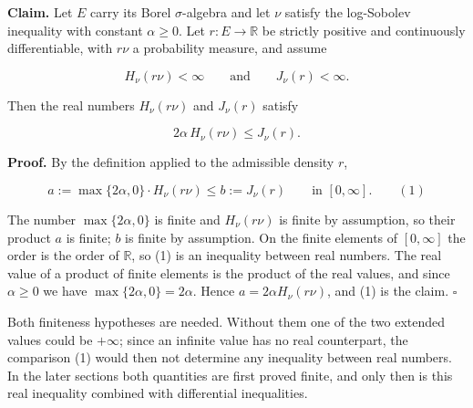 \documentclass[11pt,a4paper]{report}
\begin{document}
\textbf{Claim.} Let \(E\) carry its Borel \(\sigma\)-algebra and let \(\nu\) satisfy the log-Sobolev inequality with constant \(\alpha\ge0\). Let \(r:E\to\mathbb R\) be strictly positive and continuously differentiable, with \(r\nu\) a probability measure, and assume


\[H_\nu(r\nu)<\infty\qquad\text{and}\qquad J_\nu(r)<\infty.\]


Then the real numbers \(H_\nu(r\nu)\) and \(J_\nu(r)\) satisfy


\[2\alpha\,H_\nu(r\nu)\le J_\nu(r).\]


\textbf{Proof.} By the definition applied to the admissible density \(r\),


\[a:=\max\{2\alpha,0\}\cdot H_\nu(r\nu)\le b:=J_\nu(r)\qquad\text{in }[0,\infty].\qquad(1)\]


The number \(\max\{2\alpha,0\}\) is finite and \(H_\nu(r\nu)\) is finite by assumption, so their product \(a\) is finite; \(b\) is finite by assumption. On the finite elements of \([0,\infty]\) the order is the order of \(\mathbb R\), so (1) is an inequality between real numbers. The real value of a product of finite elements is the product of the real values, and since \(\alpha\ge0\) we have \(\max\{2\alpha,0\}=2\alpha\). Hence \(a=2\alpha H_\nu(r\nu)\), and (1) is the claim. \(\square\)




Both finiteness hypotheses are needed. Without them one of the two extended values could be \(+\infty\); since an infinite value has no real counterpart, the comparison (1) would then not determine any inequality between real numbers. In the later sections both quantities are first proved finite, and only then is this real inequality combined with differential inequalities.
\end{document}
